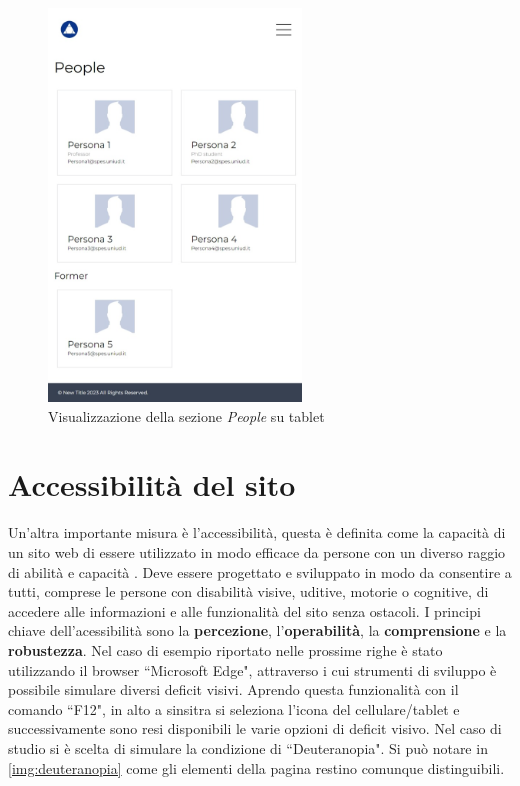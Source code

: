 \documentclass[target=bach,aauheader=]{thud}
\begin{document}
\begin{figure}
    \centering
    \includegraphics[width = 0.6\textwidth]{images/people-tablet.png}
    \caption{Visualizzazione della sezione \textit{People} su tablet}
    \label{img:computertab}
\end{figure}

\section{Accessibilità del sito}
Un'altra importante misura è l'accessibilità, questa è definita come la capacità di un sito web di essere utilizzato in modo efficace da persone con un diverso raggio di abilità e capacità \cite{campoverde2023accessibility}.
Deve essere progettato e sviluppato in modo da consentire a tutti, comprese le persone con disabilità visive, uditive, motorie o cognitive, di accedere alle informazioni e alle funzionalità del sito senza ostacoli.
\newline
I principi chiave dell'acessibilità sono la \textbf{percezione}, l'\textbf{operabilità}, la \textbf{comprensione} e la \textbf{robustezza}.
\newline \newline
Nel caso di esempio riportato nelle prossime righe è stato utilizzando il browser ``Microsoft Edge", attraverso i cui strumenti di sviluppo è possibile simulare diversi deficit visivi.  
Aprendo questa funzionalità con il comando ``F12", in alto a sinsitra si seleziona l'icona del cellulare/tablet e successivamente sono resi disponibili le varie opzioni di deficit visivo. 
Nel caso di studio si è scelta di simulare la condizione di ``Deuteranopia". 
Si può notare in \cref{img:deuteranopia} come gli elementi della pagina restino comunque distinguibili.  
\end{document}
